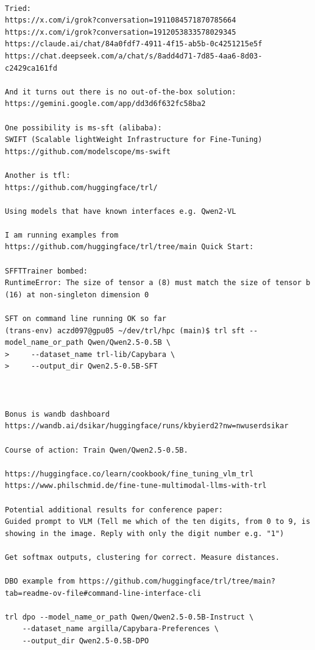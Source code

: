 \begin{verbatim}

Tried:
https://x.com/i/grok?conversation=1911084571870785664
https://x.com/i/grok?conversation=1912053833578029345
https://claude.ai/chat/84a0fdf7-4911-4f15-ab5b-0c4251215e5f
https://chat.deepseek.com/a/chat/s/8add4d71-7d85-4aa6-8d03-c2429ca161fd

And it turns out there is no out-of-the-box solution:
https://gemini.google.com/app/dd3d6f632fc58ba2

One possibility is ms-sft (alibaba):
SWIFT (Scalable lightWeight Infrastructure for Fine-Tuning)
https://github.com/modelscope/ms-swift

Another is tfl:
https://github.com/huggingface/trl/

Using models that have known interfaces e.g. Qwen2-VL

I am running examples from https://github.com/huggingface/trl/tree/main Quick Start:

SFFTTrainer bombed:
RuntimeError: The size of tensor a (8) must match the size of tensor b (16) at non-singleton dimension 0

SFT on command line running OK so far
(trans-env) aczd097@gpu05 ~/dev/trl/hpc (main)$ trl sft --model_name_or_path Qwen/Qwen2.5-0.5B \
>     --dataset_name trl-lib/Capybara \
>     --output_dir Qwen2.5-0.5B-SFT



Bonus is wandb dashboard
https://wandb.ai/dsikar/huggingface/runs/kbyierd2?nw=nwuserdsikar

Course of action: Train Qwen/Qwen2.5-0.5B.

https://huggingface.co/learn/cookbook/fine_tuning_vlm_trl
https://www.philschmid.de/fine-tune-multimodal-llms-with-trl

Potential additional results for conference paper:
Guided prompt to VLM (Tell me which of the ten digits, from 0 to 9, is showing in the image. Reply with only the digit number e.g. "1")

Get softmax outputs, clustering for correct. Measure distances.

DBO example from https://github.com/huggingface/trl/tree/main?tab=readme-ov-file#command-line-interface-cli

trl dpo --model_name_or_path Qwen/Qwen2.5-0.5B-Instruct \
    --dataset_name argilla/Capybara-Preferences \
    --output_dir Qwen2.5-0.5B-DPO 


\end{verbatim}
